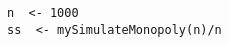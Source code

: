 \begin{description}
\begin{lstlisting}
n  <- 1000
ss  <- mySimulateMonopoly(n)/n
\end{lstlisting}












\end{description}



